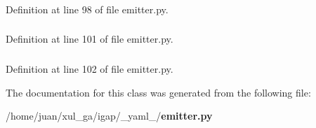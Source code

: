 \subsubsection{}\label{class__yaml___1_1emitter_1_1Emitter_8c648c0c9cd22a6dea0c2679f531b85f}




Definition at line 98 of file emitter.py.
\subsubsection{}\label{class__yaml___1_1emitter_1_1Emitter_7814743e9958da12be536aaaf886cb81}




Definition at line 101 of file emitter.py.
\subsubsection{}\label{class__yaml___1_1emitter_1_1Emitter_197413b9046099908518d61aef9ed982}




Definition at line 102 of file emitter.py.

The documentation for this class was generated from the following file:\begin{CompactItemize}
\item 
/home/juan/xul\_\-ga/igap/\_\-yaml\_\-/{\bf emitter.py}\end{CompactItemize}
